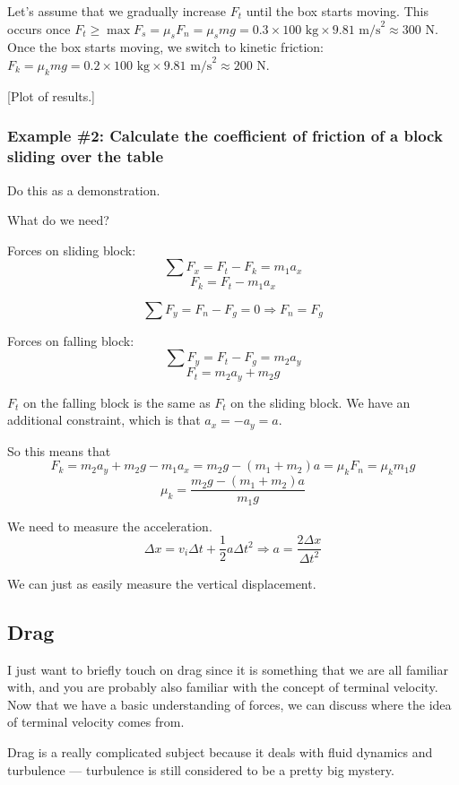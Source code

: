Let's assume that we gradually increase $F_t$ until the box starts moving. This occurs once $F_t\geq \max F_s=\mu_s F_n=\mu_s mg=0.3\times 100\mbox{ kg}\times 9.81\mbox{ m/s}^2\approx 300\mbox{ N}$. Once the box starts moving, we switch to kinetic friction: $F_k=\mu_k mg=0.2\times 100\mbox{ kg}\times 9.81\mbox{ m/s}^2\approx 200\mbox{ N}$.

[Plot of results.]
\vspace{5cm}

\subsubsection*{Example \#2: Calculate the coefficient of friction of a block sliding over the table}
Do this as a demonstration.

What do we need?

Forces on sliding block:
$$\sum F_x=F_t-F_k=m_1a_x$$
$$F_k=F_t-m_1a_x$$

$$\sum F_y=F_n-F_g=0\Rightarrow F_n=F_g$$

Forces on falling block:
$$\sum F_y=F_t-F_g=m_2a_y$$
$$F_t=m_2a_y+m_2g$$

$F_t$ on the falling block is the same as $F_t$ on the sliding block. We have an additional constraint, which is that $a_x=-a_y=a$.

So this means that
$$F_k=m_2a_y+m_2g-m_1a_x=m_2g-(m_1+m_2)a=\mu_kF_n=\mu_km_1g$$
$$\mu_k=\frac{m_2g-(m_1+m_2)a}{m_1g}$$

We need to measure the acceleration.
$$\Delta{x}=v_i\Delta{t}+\frac{1}{2}a\Delta{t}^2\Rightarrow a=\frac{2\Delta{x}}{\Delta{t}^2}$$

We can just as easily measure the vertical displacement.



\subsection{Drag}
I just want to briefly touch on drag since it is something that we are all familiar with, and you are probably also familiar with the concept of terminal velocity. Now that we have a basic understanding of forces, we can discuss where the idea of terminal velocity comes from.

Drag is a really complicated subject because it deals with fluid dynamics and turbulence --- turbulence is still considered to be a pretty big mystery.


